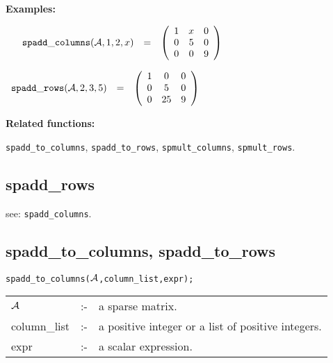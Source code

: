 {\bf Examples:}

\begin{flushleft}
\begin{math}
\hspace*{0.16in}
\begin{array}{ccc}
{\tt spadd\_columns}({\cal A},1,2,x) & = & 
\left( \begin{array}{ccc} 1 & x & 0 \\ 0 & 5 & 0 \\ 0 & 0 & 9
\end{array} \right)  
\end{array}
\end{math}
\end{flushleft}

\vspace*{0.1in}

\begin{flushleft}
\hspace*{0.1in}
\begin{math}
\begin{array}{ccc}
{\tt spadd\_rows}({\cal A},2,3,5) & = & 
\left( \begin{array}{ccc} 1 & 0 & 0 \\ 0 & 5 & 0 \\ 0 & 25 & 9 
\end{array} \right)  
\end{array}
\end{math}
\end{flushleft}

{\bf Related functions:}

\hspace*{0.175in} {\tt spadd\_to\_columns}, {\tt spadd\_to\_rows}, 
{\tt spmult\_columns}, {\tt spmult\_rows}.


\subsection{spadd\_rows}

\hspace*{0.175in} see: {\tt spadd\_columns}.


\subsection{spadd\_to\_columns, spadd\_to\_rows}

\hspace*{0.175in} {\tt spadd\_to\_columns(${\cal A}$,column\_list,expr);}

\hspace*{0.1in}
\begin{tabular}{l l l}
${\cal A}$   &:-& a sparse matrix. \\
column\_list &:-& a positive integer or a list of positive integers. \\
expr        &:-& a scalar expression.
\end{tabular}

